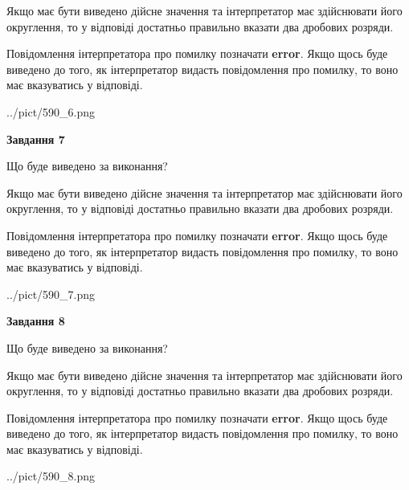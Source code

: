 \documentclass[12pt, ukrainian]{article}
\begin{document}
{\begin {Large}
Якщо має бути виведено дійсне значення та інтерпретатор має здійснювати його округлення, 
то у відповіді достатньо правильно вказати два дробових розряди.

Повідомлення інтерпретатора про помилку позначати \textbf{error}.
Якщо щось буде виведено до того, як інтерпретатор видасть повідомлення про помилку, 
то воно має вказуватись у відповіді. \par

\begin{center}
	{../pict/590_6.png}
\end{center}
\newpage

{\begin {center}\textbf{Завдання 7}\end {center}}\par
Що буде виведено за виконання? \par

Якщо має бути виведено дійсне значення та інтерпретатор має здійснювати його округлення, 
то у відповіді достатньо правильно вказати два дробових розряди.

Повідомлення інтерпретатора про помилку позначати \textbf{error}.
Якщо щось буде виведено до того, як інтерпретатор видасть повідомлення про помилку, 
то воно має вказуватись у відповіді. \par

\begin{center}
	{../pict/590_7.png}
\end{center}
\newpage

{\begin {center}\textbf{Завдання 8}\end {center}}\par
Що буде виведено за виконання? \par

Якщо має бути виведено дійсне значення та інтерпретатор має здійснювати його округлення, 
то у відповіді достатньо правильно вказати два дробових розряди.

Повідомлення інтерпретатора про помилку позначати \textbf{error}.
Якщо щось буде виведено до того, як інтерпретатор видасть повідомлення про помилку, 
то воно має вказуватись у відповіді. \par

\begin{center}
	{../pict/590_8.png}
\end{center}
\newpage


\end{Large}}
\end{document}
